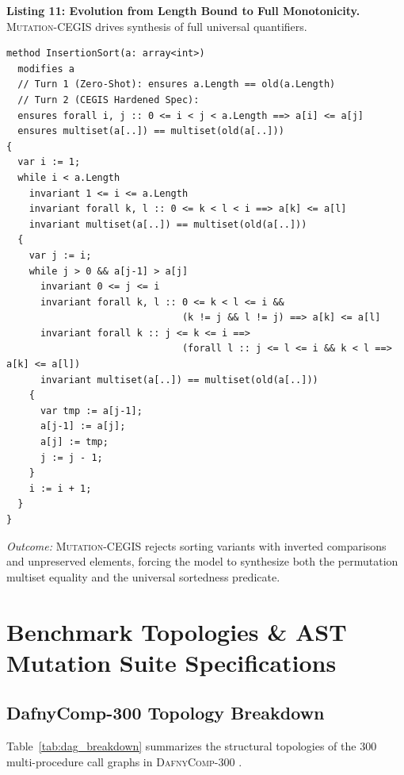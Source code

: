 \documentclass{article}
\begin{document}
\vspace{0.3em}
\noindent\textbf{Listing 11: Evolution from Length Bound to Full Monotonicity.} \textsc{Mutation-CEGIS} drives synthesis of full universal quantifiers.
{\footnotesize
\begin{verbatim}
method InsertionSort(a: array<int>)
  modifies a
  // Turn 1 (Zero-Shot): ensures a.Length == old(a.Length)
  // Turn 2 (CEGIS Hardened Spec):
  ensures forall i, j :: 0 <= i < j < a.Length ==> a[i] <= a[j]
  ensures multiset(a[..]) == multiset(old(a[..]))
{
  var i := 1;
  while i < a.Length
    invariant 1 <= i <= a.Length
    invariant forall k, l :: 0 <= k < l < i ==> a[k] <= a[l]
    invariant multiset(a[..]) == multiset(old(a[..]))
  {
    var j := i;
    while j > 0 && a[j-1] > a[j]
      invariant 0 <= j <= i
      invariant forall k, l :: 0 <= k < l <= i &&
                               (k != j && l != j) ==> a[k] <= a[l]
      invariant forall k :: j <= k <= i ==> 
                               (forall l :: j <= l <= i && k < l ==> a[k] <= a[l])
      invariant multiset(a[..]) == multiset(old(a[..]))
    {
      var tmp := a[j-1];
      a[j-1] := a[j];
      a[j] := tmp;
      j := j - 1;
    }
    i := i + 1;
  }
}
\end{verbatim}
}
\textit{Outcome:} \textsc{Mutation-CEGIS} rejects sorting variants with inverted comparisons and unpreserved elements, forcing the model to synthesize both the permutation multiset equality and the universal sortedness predicate.

\section{Benchmark Topologies \& AST Mutation Suite Specifications}
\label{app:benchmark_topology}

\subsection{DafnyComp-300 Topology Breakdown}

Table~\ref{tab:dag_breakdown} summarizes the structural topologies of the 300 multi-procedure call graphs in \textsc{DafnyComp-300} \citep{xu2025dafnycomp}.
\end{document}
